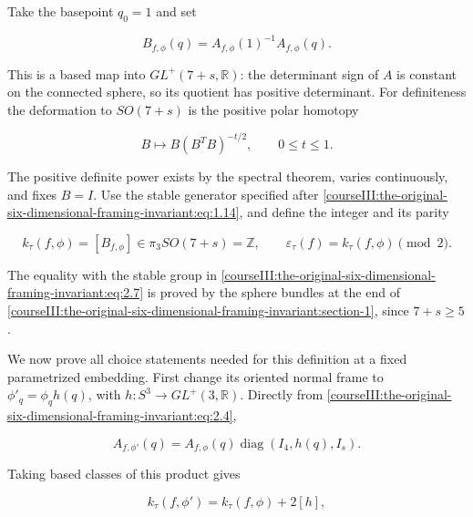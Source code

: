 Take the basepoint \(q_0=1\) and set

\begin{equation}
B_{f,\phi}(q)=A_{f,\phi}(1)^{-1}A_{f,\phi}(q).
 \label{courseIII:the-original-six-dimensional-framing-invariant:eq:2.5}
\end{equation}

This is a based map into \(GL^+(7+s,\mathbb R)\): the determinant sign of \(A\) is constant on the connected sphere, so its quotient has positive determinant. For definiteness the deformation to \(SO(7+s)\) is the positive polar homotopy

\begin{equation}
B\longmapsto B(B^TB)^{-t/2},\qquad 0\le t\le1.
 \label{courseIII:the-original-six-dimensional-framing-invariant:eq:2.6}
\end{equation}

The positive definite power exists by the spectral theorem, varies continuously, and fixes \(B=I\). Use the stable generator specified after \eqref{courseIII:the-original-six-dimensional-framing-invariant:eq:1.14}, and define the integer and its parity

\begin{equation}
k_\tau(f,\phi)=[B_{f,\phi}]\in\pi_3SO(7+s)=\mathbb Z,
 \qquad
 \varepsilon_\tau(f)=k_\tau(f,\phi)\pmod2.
 \label{courseIII:the-original-six-dimensional-framing-invariant:eq:2.7}
\end{equation}

The equality with the stable group in \eqref{courseIII:the-original-six-dimensional-framing-invariant:eq:2.7} is proved by the sphere bundles at the end of \cref{courseIII:the-original-six-dimensional-framing-invariant:section-1}, since \(7+s\ge5\).

We now prove all choice statements needed for this definition at a fixed parametrized embedding. First change its oriented normal frame to \(\phi'_q=\phi_qh(q)\), with \(h:S^3\to GL^+(3,\mathbb R)\). Directly from \eqref{courseIII:the-original-six-dimensional-framing-invariant:eq:2.4},

\begin{equation}
A_{f,\phi'}(q)=
 A_{f,\phi}(q)\operatorname{diag}(I_4,h(q),I_s).
 \label{courseIII:the-original-six-dimensional-framing-invariant:eq:2.8}
\end{equation}

Taking based classes of this product gives

\begin{equation}
k_\tau(f,\phi')=k_\tau(f,\phi)+2[h],
 \label{courseIII:the-original-six-dimensional-framing-invariant:eq:2.9}
\end{equation}

